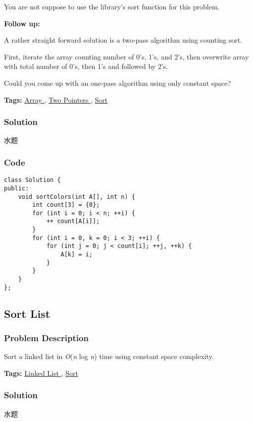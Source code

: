 \documentclass{article}
\begin{document}
\begin{CJK*}{UTF8}{gkai}
You are not suppose to use the library's sort function for this problem.

\textbf{Follow up:}


A rather straight forward solution is a two-pass algorithm using counting sort.


First, iterate the array counting number of 0's, 1's, and 2's, then overwrite array with total number of 0's, then 1's and followed by 2's.

Could you come up with an one-pass algorithm using only constant space?


\textbf{Tags: }
\hyperref[ Array ]{ Array },  \hyperref[ Two Pointers ]{ Two Pointers },  \hyperref[ Sort ]{ Sort }



\subsubsection*{Solution}
水题

\subsubsection*{Code}
\begin{lstlisting}
class Solution {
public:
    void sortColors(int A[], int n) {
        int count[3] = {0};
        for (int i = 0; i < n; ++i) {
            ++ count[A[i]];
        }
        for (int i = 0, k = 0; i < 3; ++i) {
            for (int j = 0; j < count[i]; ++j, ++k) {
                A[k] = i;
            }
        }
    }
}; 
\end{lstlisting}


\subsection{ Sort List }
\label{ Sort List }

\subsubsection*{Problem Description}
Sort a linked list in \emph{O}(\emph{n} log \emph{n}) time using constant space complexity.


\textbf{Tags: }
\hyperref[ Linked List ]{ Linked List },  \hyperref[ Sort ]{ Sort }



\subsubsection*{Solution}
水题


\end{CJK*}
\end{document}
